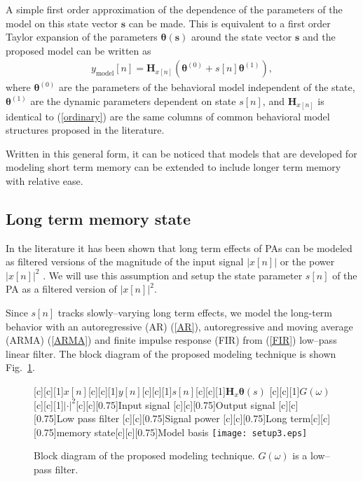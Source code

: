 \documentclass[journal]{IEEEtran}
\begin{document}
A simple first order approximation of the dependence of the parameters of the model on this state vector $\mathbf{s}$ can be made. This is equivalent to a first order Taylor expansion of the parameters $\bm{\theta}\mathbf{(s)}$ around the state vector $\mathbf{s}$ and the proposed model can be written as
\begin{align}
y_{\text{model}}[n] = \mathbf{H}_{x[n]}\left(\bm{\theta}^{(0)} + s[n]\bm{\theta}^{(1)}\right), \label{model_structure}
\end{align}
where $\bm{\theta}^{(0)}$ are the parameters of the behavioral model independent of the state, $\bm{\theta}^{(1)}$ are the dynamic parameters dependent on state $s[n]$, and $\mathbf{H}_{x[n]}$ is identical to (\ref{ordinary}) are the same columns of common behavioral model structures proposed in the literature.

Written in this general form, it can be noticed that models that are developed for modeling short term memory can be extended to include longer term memory with relative ease.

\subsection{Long term memory state}
In the literature it has been shown that long term effects of PAs can be modeled as filtered versions of the magnitude of the input signal $|x[n]|$ or the power $|x[n]|^2$ \cite{ngoya,crespo2011,ngoya2009}. We will use this assumption and setup the state parameter $s[n]$ of the PA as a filtered version of $|x[n]|^2$.

Since $s[n]$ tracks slowly--varying long term effects, we model the long-term behavior with an autoregressive (AR) (\ref{AR}), autoregressive and moving average (ARMA) (\ref{ARMA}) and finite impulse response (FIR) from \cite{soltani2012} (\ref{FIR}) low--pass linear filter. The block diagram of the proposed modeling technique is shown Fig.~\ref{setup1}.
\begin{figure}
\centering
{}[c][c][1]{$x[n]$}[c][c][1]{$y[n]$}[c][c][1]{$s[n]$}[c][c][1]{$\mathbf{H}_x\bm{\theta}(s)$}
[c][c][1]{$G(\omega)$}[c][c][1]{$|\cdot|^2$}[c][c][0.75]{Input signal} [c][c][0.75]{Output signal} [c][c][0.75]{Low pass filter} [c][c][0.75]{Signal power} [c][c][0.75]{Long term}[c][c][0.75]{memory state}[c][c][0.75]{Model basis}
\texttt{[image: setup3.eps]}
\caption{Block diagram of the proposed modeling technique. $G(\omega)$ is a low--pass filter.} \label{setup1}
\end{figure}
\end{document}
